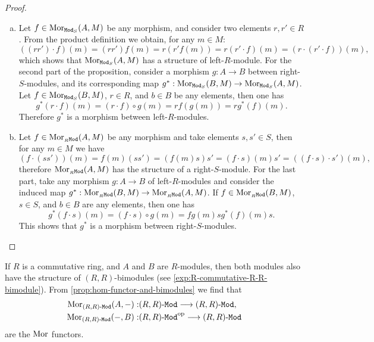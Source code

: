 \begin{proof}
\begin{enumerate}[(a)]
        \item Let \(f \in \operatorname{Mor}_{{\texttt{Mod}_{S}}}(A, M)\) be any morphism, and consider two
              elements \(r, r' \in R\). From the product definition we obtain, for any
              \(m \in M\):
              \[
                  ((r r') \cdot f)(m) = (r r') f(m) = r (r' f(m)) = r (r' \cdot f)(m)
                  = (r \cdot (r' \cdot f))(m),
              \]
              which shows that \(\operatorname{Mor}_{{\texttt{Mod}_{S}}}(A, M)\) has a structure of
              left-\(R\)-module. For the second part of the proposition, consider a morphism
              \(g: A \to B\) between right-\(S\)-modules, and its corresponding map
              \(g^{*}: \operatorname{Mor}_{{\texttt{Mod}_{S}}}(B, M) \to \operatorname{Mor}_{{\texttt{Mod}_{S}}}(A, M)\). Let \(f \in
              \operatorname{Mor}_{{\texttt{Mod}_{S}}}(B, M)\), \(r \in R\), and \(b \in B\) be any elements, then
              one has
              \[
                  g^{*}(r \cdot f)(m)
                  = (r \cdot f) \circ g(m)
                  = r f(g(m))
                  = r g^{*}(f)(m).
              \]
              Therefore \(g^{*}\) is a morphism between left-\(R\)-modules.

        \item Let \(f \in \operatorname{Mor}_{{{}_{R}\texttt{Mod}}}(A, M)\) be any morphism and take elements \(s,
              s' \in S\), then for any \(m \in M\) we have
              \[
                  (f \cdot (s s'))(m) = f(m)(s s') = (f(m) s) s'
                  = (f \cdot s)(m) s'
                  = ((f \cdot s) \cdot s')(m),
              \]
              therefore \(\operatorname{Mor}_{{{}_{R}\texttt{Mod}}}(A, M)\) has the structure of a
              right-\(S\)-module. For the last part, take any morphism \(g: A \to B\) of
              left-\(R\)-modules and consider the induced map \(g^{*}: \operatorname{Mor}_{{{}_{R}\texttt{Mod}}}(B, M)
              \to \operatorname{Mor}_{{{}_{R}\texttt{Mod}}}(A, M)\). If \(f \in \operatorname{Mor}_{{{}_{R}\texttt{Mod}}}(B, M)\), \(s \in S\),
              and \(b \in B\) are any elements, then one has
              \[
                  g^{*}(f \cdot s)(m) = (f \cdot s) \circ g(m)
                  = f g(m) s
                  g^{*}(f)(m) s.
              \]
              This shows that \(g^{*}\) is a morphism between right-\(S\)-modules.
    \end{enumerate}
\end{proof}

\begin{example}
    \label{exp:R-commutative-hom-functors}
    If \(R\) is a commutative ring, and \(A\) and \(B\) are \(R\)-modules, then both
    modules also have the structure of \((R, R)\)-bimodules (see
    \cref{exp:R-commutative-R-R-bimodule}). From
    \cref{prop:hom-functor-and-bimodules} we find that
    \begin{align*}
        \operatorname{Mor}_{{(R, R)\text{-}\texttt{Mod}}}(A, -): & {(R, R)\text{-}\texttt{Mod}} \longrightarrow {(R, R)\text{-}\texttt{Mod}},      \\
        \operatorname{Mor}_{{(R, R)\text{-}\texttt{Mod}}}(-, B): & {(R, R)\text{-}\texttt{Mod}}^{\mathrm{op}} \longrightarrow {(R, R)\text{-}\texttt{Mod}}
    \end{align*}
    are the \(\operatorname{Mor}\) functors.
\end{example}

